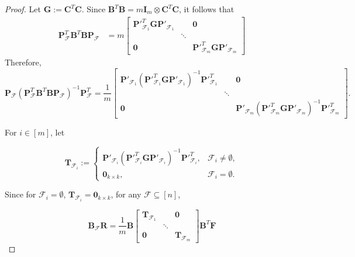 \documentclass[journal,draftcls,onecolumn]{IEEEtran}
\theoremstyle{mystyle}
\newcommand{\bfC}{\mathbf{C}}
\newcommand{\bfF}{\mathbf{F}}
\newcommand{\bfB}{\mathbf{B}}
\newcommand{\bfI}{\mathbf{I}}
\newcommand{\bfR}{\mathbf{R}}
\newcommand{\cF}{\mathcal{F}}
\newcommand{\sifat}[1]{\marginpar{+}{\bf Sifat's remark}: {\em #1}}
\begin{document}
\begin{proof}
Let $\mathbf{G}:=\mathbf{C}^T\mathbf{C}.$ Since $\bfB^T\bfB = m \bfI_m \otimes \bfC^T \bfC$, it follows that
\begin{align*}
\mathbf{P}_{\mathcal{F}}^T\mathbf{B}^T\mathbf{B}
\mathbf{P}_{\mathcal{F}}
& = m
\begin{bmatrix}
\mathbf{P}'^{T}_{\mathcal{F}_1} \mathbf{G}\mathbf{P}'_{\mathcal{F}_1}
& & \mathbf{0}\\
&
\ddots
&\\
\mathbf{0}
& &
\mathbf{P}'^{T}_{\mathcal{F}_m}\mathbf{G}\mathbf{P}'_{\mathcal{F}_m}
\end{bmatrix}
\end{align*}
 Therefore,
\[
\mathbf{P}_{\mathcal{F}}
(\mathbf{P}_{\mathcal{F}}^T\mathbf{B}^T\mathbf{B}
\mathbf{P}_{\mathcal{F}})^{-1}
\mathbf{P}_{\mathcal{F}}^T
=
\frac{1}{m}
\begin{bmatrix}
\mathbf{P}'_{\mathcal{F}_1}
\left(
\mathbf{P}'^{T}_{\mathcal{F}_1}
\mathbf{G}
\mathbf{P}'_{\mathcal{F}_1}
\right)^{-1}
\mathbf{P}'^{T}_{\mathcal{F}_1} & & \mathbf{0}\\
& \ddots &\\
\mathbf{0} & & \mathbf{P}'_{\mathcal{F}_m}
\left(
\mathbf{P}'^{T}_{\mathcal{F}_m}
\mathbf{G}
\mathbf{P}'_{\mathcal{F}_m}
\right)^{-1}
\mathbf{P}'^{T}_{\mathcal{F}_m}
\end{bmatrix}.
\]


For $i\in[m]$, let



\[
\mathbf{T}_{\mathcal{F}_i} :=
\begin{cases}
\mathbf{P}'_{\mathcal{F}_i}
\left(
\mathbf{P}'^{T}_{\mathcal{F}_i}
\mathbf{G}
\mathbf{P}'_{\mathcal{F}_i}
\right)^{-1}
\mathbf{P}'^{T}_{\mathcal{F}_i}, & \mathcal{F}_i \neq \emptyset, \\[0.5em]
\mathbf{0}_{k \times k}, & \mathcal{F}_i = \emptyset.
\end{cases}
\]



Since for $\cF_i = \emptyset$, $\mathbf{T}_{\cF_i} = \mathbf{0}_{k \times k}$, for any $\cF \subseteq [n]$, 

\[\mathbf{B}_{\cF} \bfR = \frac{1}{m}\mathbf{B}\begin{bmatrix}
\mathbf{T}_{\cF_1} & & \mathbf{0}\\
& \ddots &\\
\mathbf{0} & & \mathbf{T}_{\cF_m} 
\end{bmatrix} \bfB^T \bfF\]



\end{proof}
\end{document}
